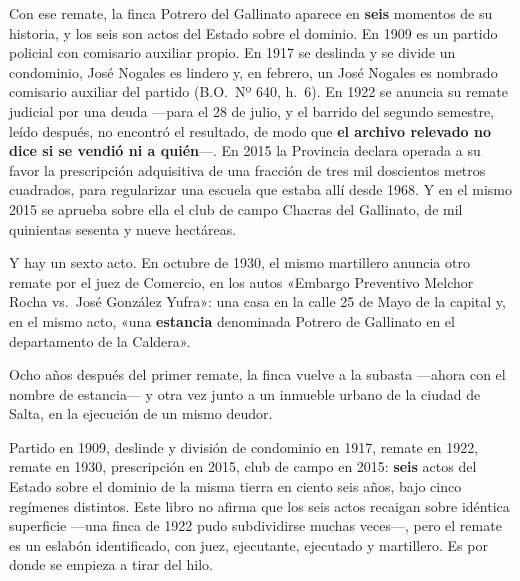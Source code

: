 Con ese remate, la finca Potrero del Gallinato aparece en \textbf{seis} momentos de su historia, y
los seis son actos del Estado sobre el dominio. En 1909 es un partido policial con
comisario auxiliar propio. En 1917 se deslinda y se divide un condominio, José Nogales es lindero y, en febrero, un José Nogales es nombrado comisario auxiliar del partido (B.O.\ Nº 640, h.\ 6).
En 1922 se anuncia su remate judicial por una deuda ---para el 28 de julio, y el barrido del segundo semestre, leído después, no encontró el resultado, de modo que \textbf{el archivo relevado no dice si se vendió ni a quién}---.
En 2015 la Provincia declara operada a su favor la prescripción adquisitiva de una fracción
de tres mil doscientos metros cuadrados, para regularizar una escuela que estaba allí desde 1968. Y
en el mismo 2015 se aprueba sobre ella el club de campo Chacras del Gallinato, de mil
quinientas sesenta y nueve hectáreas.

Y hay un sexto acto. En octubre de 1930, el mismo martillero anuncia otro remate por el
juez de Comercio, en los autos «Embargo Preventivo Melchor Rocha vs.\ José González Yufra»:
una casa en la calle 25 de Mayo de la capital y, en el mismo acto, «una \textbf{estancia}
denominada Potrero de Gallinato en el departamento de la Caldera».

Ocho años después del primer remate, la finca vuelve a la subasta —ahora con el nombre de
estancia— y otra vez junto a un inmueble urbano de la ciudad de Salta, en la ejecución de un
mismo deudor.

Partido en 1909, deslinde y división de condominio en 1917, remate en 1922, remate en 1930,
prescripción en 2015, club de campo en 2015: \textbf{seis} actos del Estado sobre el dominio de la
misma tierra en ciento seis años, bajo cinco regímenes distintos. Este libro no afirma que los seis actos recaigan sobre
idéntica superficie —una finca de 1922 pudo subdividirse muchas veces—, pero el remate es
un eslabón identificado, con juez, ejecutante, ejecutado y martillero. Es por donde se
empieza a tirar del hilo.


